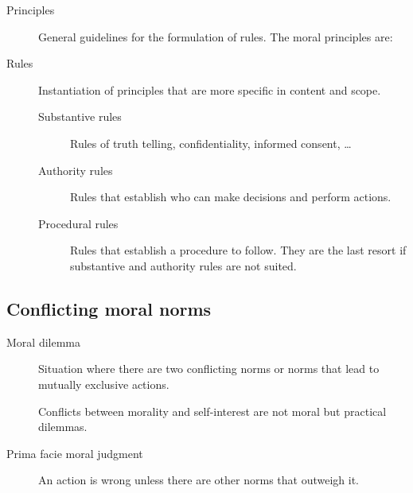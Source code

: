 \begin{description}
    \item[Principles] 
        General guidelines for the formulation of rules. The moral principles are: 

    \item[Rules] 
        Instantiation of principles that are more specific in content and scope.

        \begin{description}
            \item[Substantive rules] 
                Rules of truth telling, confidentiality, informed consent, \dots

            \item[Authority rules] 
                Rules that establish who can make decisions and perform actions.

            \item[Procedural rules] 
                Rules that establish a procedure to follow. They are the last resort if substantive and authority rules are not suited.
        \end{description}
\end{description}


\subsection{Conflicting moral norms}

\begin{description}
    \item[Moral dilemma] 
        Situation where there are two conflicting norms or norms that lead to mutually exclusive actions.

        \begin{remark}
            Conflicts between morality and self-interest are not moral but practical dilemmas.
        \end{remark}
    
    \item[Prima facie moral judgment] 
        An action is wrong unless there are other norms that outweigh it.

\end{description}




